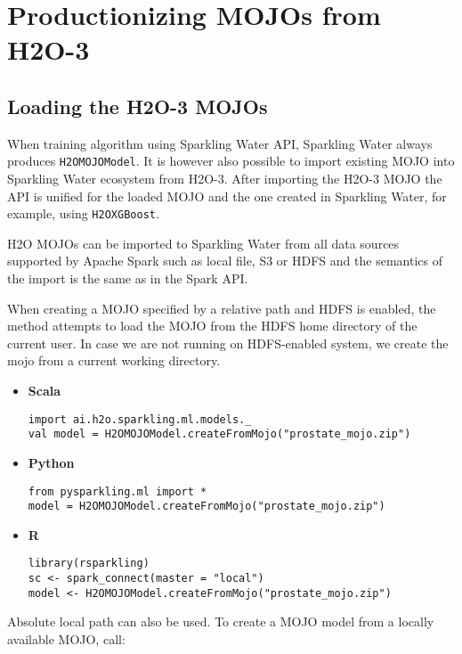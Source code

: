 \section{Productionizing MOJOs from H2O-3}

\subsection{Loading the H2O-3 MOJOs}

When training algorithm using Sparkling Water API, Sparkling Water always produces \texttt{H2OMOJOModel}. It is however also possible
to import existing MOJO into Sparkling Water ecosystem from H2O-3. After importing the H2O-3 MOJO the API is unified for the
loaded MOJO and the one created in Sparkling Water, for example, using \texttt{H2OXGBoost}.

H2O MOJOs can be imported to Sparkling Water from all data sources supported by Apache Spark such as local file, S3 or HDFS and the
semantics of the import is the same as in the Spark API.

When creating a MOJO specified by a relative path and HDFS is enabled, the method attempts to load
the MOJO from the HDFS home directory of the current user. In case we are not running on HDFS-enabled system, we create
the mojo from a current working directory.

\begin{itemize}
    \item \textbf{Scala} \begin{lstlisting}[style=Scala]
import ai.h2o.sparkling.ml.models._
val model = H2OMOJOModel.createFromMojo("prostate_mojo.zip")
    \end{lstlisting}
    \item \textbf{Python} \begin{lstlisting}[style=Python]
from pysparkling.ml import *
model = H2OMOJOModel.createFromMojo("prostate_mojo.zip")
    \end{lstlisting}
    \item \textbf{R} \begin{lstlisting}[style=R]
library(rsparkling)
sc <- spark_connect(master = "local")
model <- H2OMOJOModel.createFromMojo("prostate_mojo.zip")
    \end{lstlisting}
\end{itemize}


Absolute local path can also be used. To create a MOJO model from a locally available MOJO, call:


